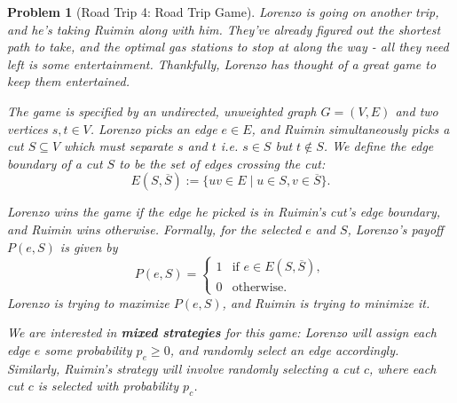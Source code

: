\documentclass[10pt]{article}
\newtheorem{problem}{\sc\color{cit}Problem}
\begin{document}
\begin{problem}[Road Trip 4: Road Trip Game] Lorenzo is going on another trip, and he's taking Ruimin along with him. They've already figured out the shortest path to take, and the optimal gas stations to stop at along the way - all they need left is some entertainment. Thankfully, Lorenzo has thought of a great game to keep them entertained.  

The game is specified by an undirected, unweighted graph $G=(V,E)$ and two vertices $s,t\in V$. Lorenzo picks an edge $e \in E$, and Ruimin simultaneously picks a cut $S \subseteq V$ which must separate $s$ and $t$ i.e. $s \in S$ but $t \not\in S$. We define the edge boundary of a cut $S$ to be the set of edges crossing the cut:
\[
    E(S,\overline{S}) := \{uv \in E \mid u \in S, v \in \overline{S}\}.
\]

\noindent
Lorenzo wins the game if the edge he picked is in Ruimin's cut's edge boundary, and Ruimin wins otherwise. Formally, for the selected $e$ and $S$, Lorenzo's payoff $P(e, S)$ is given by
\[
    P(e,S) = \begin{cases} 1 & \text{if } e\in E(S,\overline{S}),\\
    0 & \text{otherwise.}\end{cases}
\]
Lorenzo is trying to maximize $P(e, S)$, and Ruimin is trying to minimize it. 

\noindent
We are interested in \textbf{mixed strategies} for this game: Lorenzo will assign each edge $e$ some probability $p_e \geq 0$, and randomly select an edge accordingly. Similarly, Ruimin's strategy will involve randomly selecting a cut $c$, where each cut $c$ is selected with probability $p_c$.


\end{problem}
\end{document}
